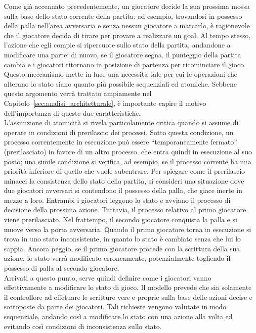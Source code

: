 Come già accennato precedentemente, un giocatore decide la sua prossima mossa sulla base dello stato corrente della partita: ad esempio, trovandosi in possesso della palla nell'area avversaria e senza nessun giocatore a marcarlo, è ragionevole che il giocatore decida di tirare per provare a realizzare un goal. Al tempo stesso, l'azione che egli compie si ripercuote sullo stato della partita, andandone a modificare una parte: di nuovo, se il giocatore segna, il punteggio della partita cambia e i giocatori ritornano in posizione di partenza per ricominciare il gioco. Questo meccanismo mette in luce una necessità tale per cui le operazioni che alterano lo stato siano quanto più possibile sequenziali ed atomiche. Sebbene questo argomento verrà trattato ampiamente nel Capitolo~\ref{sec:analisi_architetturale}, è importante capire il motivo dell'importanza di queste due caratteristiche.\\

L'assunzione di atomicità si rivela particolamente critica quando si assume di operare in condizioni di prerilascio dei processi. Sotto questa condizione, un processo correntemente in esecuzione può essere ``temporaneamente fermato'' (prerilasciato) in favore di un altro processo, che entra quindi in esecuzione al suo posto; una simile condizione si verifica, ad esempio, se il processo corrente ha una priorità inferiore di quello che vuole subentrare. Per spiegare come il prerilascio minacci la consistenza dello stato della partita, si consideri una situazione dove due giocatori avversari si contendono il possesso della palla, che giace inerte in mezzo a loro. Entrambi i giocatori leggono lo stato e avviano il processo di decisione della prossima azione. Tuttavia, il processo relativo al primo giocatore viene prerilasciato. Nel frattempo, il secondo giocatore conquista la palla e si muove verso la porta avversaria. Quando il primo giocatore torna in esecuzione si trova in uno stato inconsistente, in quanto lo stato è cambiato senza che lui lo sappia. Ancora peggio, se il primo giocatore procede con la scrittura della sua azione, lo stato verrà modificato erroneamente, potenzialmente togliendo il possesso di palla al secondo giocatore.\\

Arrivati a questo punto, serve quindi definire come i giocatori vanno effettivamente a modificare lo stato di gioco. Il modello prevede che sia solamente il controllore ad effetuare le scritture vere e proprie sulla base delle azioni decise e sottoposte da parte dei giocatori. Tali richieste vengono valutate in modo sequenziale, andando così a modificare lo stato con una azione alla volta ed evitando così condizioni di inconsistenza sullo stato.\\

